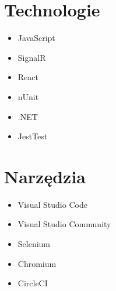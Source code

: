 \documentclass[12pt]{report}
\begin{document}
		\section{Technologie}
		\begin{itemize}
			\item JavaScript
			\item SignalR
			\item React
			\item nUnit
			\item .NET
			\item JestTest
		\end{itemize}
		
		\section{Narzędzia}
		\begin{itemize}
			\item Visual Studio Code
			\item Visual Studio Community
			\item Selenium
			\item Chromium
			\item CircleCI
		\end{itemize}
	
\end{document}
